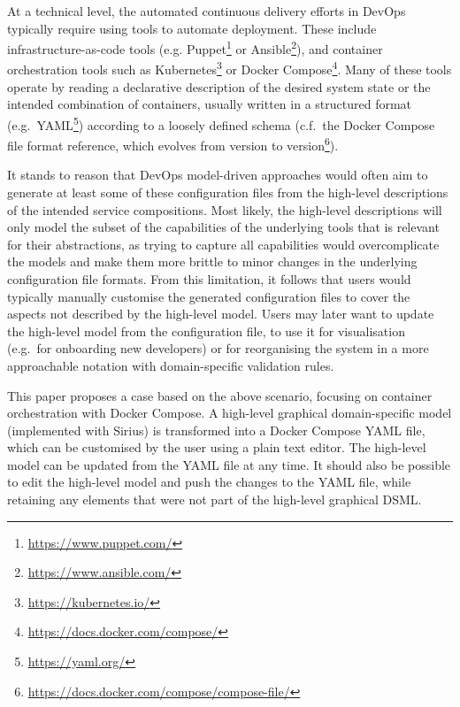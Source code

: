 \documentclass[sigconf,review]{acmart}
\begin{document}
At a technical level, the automated continuous delivery efforts in DevOps
typically require using tools to automate deployment. These include
infrastructure-as-code tools (e.g.
Puppet\footnote{\url{https://www.puppet.com/}} or
Ansible\footnote{\url{https://www.ansible.com/}}), and container orchestration
tools such as Kubernetes\footnote{\url{https://kubernetes.io/}} or Docker
Compose\footnote{\url{https://docs.docker.com/compose/}}. Many of these tools
operate by reading a declarative description of the desired system state or the
intended combination of containers, usually written in a structured format
(e.g.\ YAML\footnote{\url{https://yaml.org/}}) according to a loosely defined
schema (c.f.\ the Docker Compose file format reference, which evolves from
version to
version\footnote{\url{https://docs.docker.com/compose/compose-file/}}).

It stands to reason that DevOps model-driven approaches would often aim to
generate at least some of these configuration files from the high-level
descriptions of the intended service compositions. Most likely, the high-level
descriptions will only model the subset of the capabilities of the underlying
tools that is relevant for their abstractions, as trying to capture all
capabilities would overcomplicate the models and make them more brittle to minor
changes in the underlying configuration file formats. From this limitation, it
follows that users would typically manually customise the generated
configuration files to cover the aspects not described by the high-level model.
Users may later want to update the high-level model from the configuration file,
to use it for visualisation (e.g.\ for onboarding new developers) or for
reorganising the system in a more approachable notation with domain-specific
validation rules.

This paper proposes a case based on the above scenario, focusing on container
orchestration with Docker Compose. A high-level graphical domain-specific model
(implemented with Sirius) is transformed into a Docker Compose YAML file, which
can be customised by the user using a plain text editor. The high-level model
can be updated from the YAML file at any time. It should also be possible to
edit the high-level model and push the changes to the YAML file, while retaining
any elements that were not part of the high-level graphical DSML.
\end{document}
